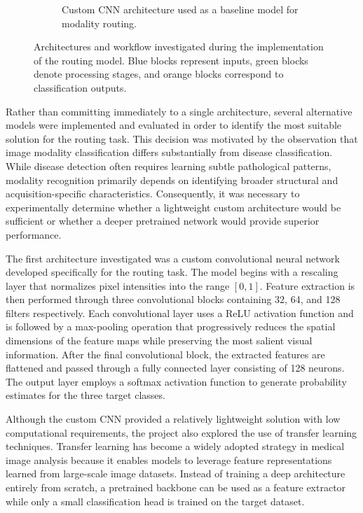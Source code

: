 \begin{figure}[htbp]
\begin{subfigure}{0.95\textwidth}
{
		}
		\caption{Custom CNN architecture used as a baseline model for modality routing.}
	\end{subfigure}
	
	\caption{Architectures and workflow investigated during the implementation of the routing model. Blue blocks represent inputs, green blocks denote processing stages, and orange blocks correspond to classification outputs.}
	\label{fig:routing_model_overview}
	
\end{figure}
Rather than committing immediately to a single architecture, several alternative models were implemented and evaluated in order to identify the most suitable solution for the routing task. This decision was motivated by the observation that image modality classification differs substantially from disease classification. While disease detection often requires learning subtle pathological patterns, modality recognition primarily depends on identifying broader structural and acquisition-specific characteristics. Consequently, it was necessary to experimentally determine whether a lightweight custom architecture would be sufficient or whether a deeper pretrained network would provide superior performance.

The first architecture investigated was a custom convolutional neural network developed specifically for the routing task. The model begins with a rescaling layer that normalizes pixel intensities into the range $[0,1]$. Feature extraction is then performed through three convolutional blocks containing 32, 64, and 128 filters respectively. Each convolutional layer uses a ReLU activation function and is followed by a max-pooling operation that progressively reduces the spatial dimensions of the feature maps while preserving the most salient visual information. After the final convolutional block, the extracted features are flattened and passed through a fully connected layer consisting of 128 neurons. The output layer employs a softmax activation function to generate probability estimates for the three target classes.

Although the custom CNN provided a relatively lightweight solution with low computational requirements, the project also explored the use of transfer learning techniques. Transfer learning has become a widely adopted strategy in medical image analysis because it enables models to leverage feature representations learned from large-scale image datasets. Instead of training a deep architecture entirely from scratch, a pretrained backbone can be used as a feature extractor while only a small classification head is trained on the target dataset.

